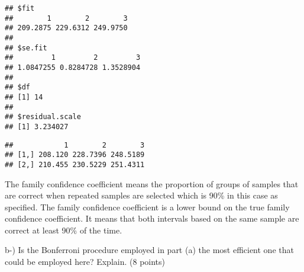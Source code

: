 \documentclass[
]{article}
\newenvironment{Shaded}{\begin{snugshade}}{\end{snugshade}}
\newcommand{\CommentTok}[1]{\textcolor[rgb]{0.56,0.35,0.01}{\textit{#1}}}
\newcommand{\DecValTok}[1]{\textcolor[rgb]{0.00,0.00,0.81}{#1}}
\newcommand{\FloatTok}[1]{\textcolor[rgb]{0.00,0.00,0.81}{#1}}
\newcommand{\KeywordTok}[1]{\textcolor[rgb]{0.13,0.29,0.53}{\textbf{#1}}}
\newcommand{\NormalTok}[1]{#1}
\newcommand{\OperatorTok}[1]{\textcolor[rgb]{0.81,0.36,0.00}{\textbf{#1}}}
\newcommand{\StringTok}[1]{\textcolor[rgb]{0.31,0.60,0.02}{#1}}
\begin{document}
\begin{verbatim}
## $fit
##        1        2        3 
## 209.2875 229.6312 249.9750 
## 
## $se.fit
##         1         2         3 
## 1.0847255 0.8284728 1.3528904 
## 
## $df
## [1] 14
## 
## $residual.scale
## [1] 3.234027
\end{verbatim}

\begin{Shaded}
\end{Shaded}

\begin{verbatim}
##            1        2        3
## [1,] 208.120 228.7396 248.5189
## [2,] 210.455 230.5229 251.4311
\end{verbatim}

The family confidence coefficient means the proportion of groups of
samples that are correct when repeated samples are selected which is
90\% in this case as specified. The family confidence coefficient is a
lower bound on the true family confidence coefficient. It means that
both intervals based on the same sample are correct at least 90\% of the
time.

b-) Is the Bonferroni procedure employed in part (a) the most efficient
one that could be employed here? Explain. (8 points)

\begin{Shaded}
\end{Shaded}
\end{document}
